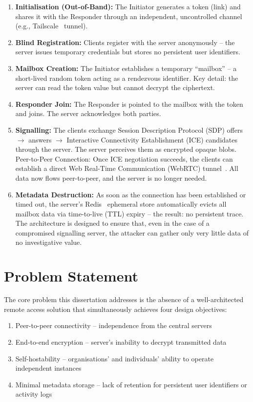 \documentclass[12pt,a4paper,oneside]{report}
\begin{document}
\begin{enumerate}
  \item \textbf{Initialisation (Out-of-Band):} The Initiator generates a token (link) and shares it with the Responder through an independent, uncontrolled channel (e.g., Tailscale~\cite{tailscale} tunnel).
  \item \textbf{Blind Registration:} Clients register with the server anonymously -- the server issues temporary credentials but stores no persistent user identifiers.
  \item \textbf{Mailbox Creation:} The Initiator establishes a temporary ``mailbox'' -- a short-lived random token acting as a rendezvous identifier. Key detail: the server can read the token value but cannot decrypt the ciphertext.
  \item \textbf{Responder Join:} The Responder is pointed to the mailbox with the token and joins. The server acknowledges both parties.
  \item \textbf{Signalling:} The clients exchange Session Description Protocol (SDP) offers $\rightarrow$ answers $\rightarrow$ Interactive Connectivity Establishment (ICE) candidates through the server. The server perceives them as encrypted opaque blobs. Peer-to-Peer Connection: Once ICE negotiation succeeds, the clients can establish a direct Web Real-Time Communication (WebRTC) tunnel~\cite{rfc8825}. All data now flows peer-to-peer, and the server is no longer needed.
  \item \textbf{Metadata Destruction:} As soon as the connection has been established or timed out, the server's Redis~\cite{redis} ephemeral store automatically evicts all mailbox data via time-to-live (TTL) expiry -- the result: no persistent trace. The architecture is designed to ensure that, even in the case of a compromised signalling server, the attacker can gather only very little data of no investigative value.
\end{enumerate}


\section{Problem Statement}
\label{sec:problem}

The core problem this dissertation addresses is the absence of a well-architected remote access solution that simultaneously achieves four design objectives:

\begin{enumerate}
  \item Peer-to-peer connectivity -- independence from the central servers
  \item End-to-end encryption -- server's inability to decrypt transmitted data
  \item Self-hostability -- organisations' and individuals' ability to operate independent instances
  \item Minimal metadata storage -- lack of retention for persistent user identifiers or activity logs
\end{enumerate}
\end{document}
